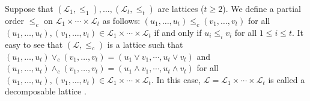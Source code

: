 \documentclass[preprint,review,10pt]{amsart}
\theoremstyle{definition}
\theoremstyle{remark}
\numberwithin{equation}{section}
\begin{document}
Suppose that $(\mathscr{L}_1,\le_1),\ldots,(\mathscr{L}_t,\le_t)$ are lattices ($t \geq 2$). We define a partial order $\le_c$ on $\mathscr{L}_1 \times \cdots \times \mathscr{L}_t$ as follows: $(u_1,\ldots,u_t) \le_c (v_1,\ldots,v_t)$ for all $(u_1,\ldots,u_t), (v_1,\ldots,v_t) \in \mathscr{L}_1 \times \cdots \times \mathscr{L}_t$ if and only if $u_i \le_i v_i$ for all $1 \le i \le t$. It easy to see that $(\mathscr{L},\le_c)$ is a lattice such that $(u_1,\ldots,u_t) \vee_c (v_1,\ldots,v_t)=(u_1 \vee v_1,\cdots,u_t \vee v_t)$ and $(u_1,\ldots,u_t) \wedge_c (v_1,\ldots,v_t)=(u_1 \wedge v_1,\cdots,u_t \wedge v_t)$ for all $(u_1,\ldots,u_t), (v_1,\ldots,v_t) \in \mathscr{L}_1 \times \cdots \times \mathscr{L}_t$. In this case,  $\mathscr{L}=\mathscr{L}_1 \times \cdots \times \mathscr{L}_t$ is called a decomposable lattice \cite{Atani2}.
\end{document}
